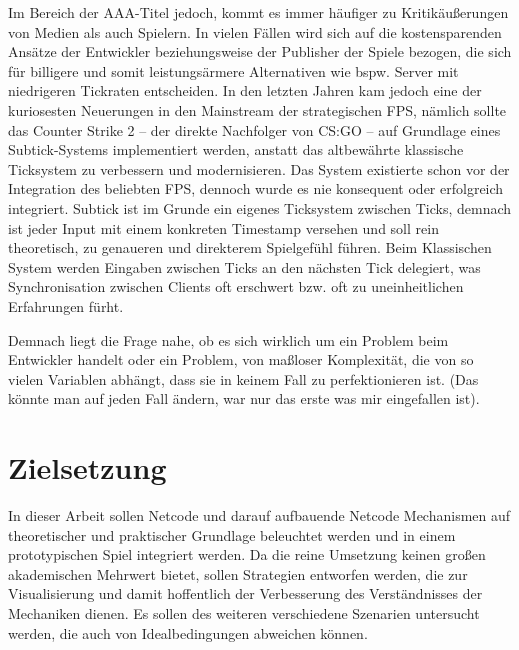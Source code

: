Im Bereich der AAA-Titel jedoch, kommt es immer häufiger zu Kritikäußerungen von Medien als auch Spielern. In vielen Fällen wird sich auf die kostensparenden Ansätze der Entwickler beziehungsweise der Publisher der Spiele bezogen, die sich für billigere und somit leistungsärmere Alternativen wie bspw. Server mit niedrigeren Tickraten entscheiden.
In den letzten Jahren kam jedoch eine der kuriosesten Neuerungen in den Mainstream der strategischen FPS, nämlich sollte das Counter Strike 2 -- der direkte Nachfolger von CS:GO -- auf Grundlage eines Subtick-Systems implementiert werden, anstatt das altbewährte klassische Ticksystem zu verbessern und modernisieren.
Das System existierte schon vor der Integration des beliebten FPS, dennoch wurde es nie konsequent oder erfolgreich integriert. 
Subtick ist im Grunde ein eigenes Ticksystem zwischen Ticks, demnach ist jeder Input mit einem konkreten Timestamp versehen und soll rein theoretisch, zu genaueren und direkterem Spielgefühl führen.
Beim Klassischen System werden Eingaben zwischen Ticks an den nächsten Tick delegiert, was Synchronisation zwischen Clients oft erschwert bzw. oft zu uneinheitlichen Erfahrungen fürht.

Demnach liegt die Frage nahe, ob es sich wirklich um ein Problem beim Entwickler handelt oder ein Problem, von maßloser Komplexität, die von so vielen Variablen abhängt, dass sie in keinem Fall zu perfektionieren ist.
(Das könnte man auf jeden Fall ändern, war nur das erste was mir eingefallen ist).
\section{Zielsetzung}
In dieser Arbeit sollen Netcode und darauf aufbauende Netcode Mechanismen auf theoretischer und praktischer Grundlage beleuchtet werden und in einem prototypischen Spiel integriert werden.
Da die reine Umsetzung keinen großen akademischen Mehrwert bietet, sollen Strategien entworfen werden, die zur Visualisierung und damit hoffentlich der Verbesserung des Verständnisses der Mechaniken dienen.
Es sollen des weiteren verschiedene Szenarien untersucht werden, die auch von Idealbedingungen abweichen können.